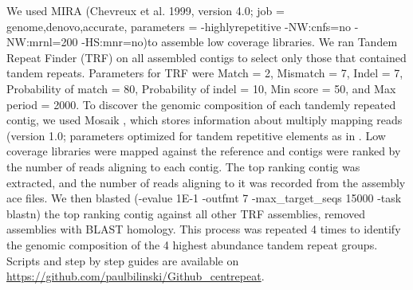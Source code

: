 \documentclass[10pt,letterpaper]{article}
\begin{document}
We used MIRA (Chevreux et al. 1999, version 4.0; job = genome,denovo,accurate, parameters = -highlyrepetitive -NW:cnfs=no -NW:mrnl=200 -HS:mnr=no)to assemble low coverage libraries.
We ran Tandem Repeat Finder \cite{benson1999tandem}  (TRF) on all assembled contigs to select only those that contained tandem repeats. 
Parameters for TRF were Match = 2, Mismatch = 7, Indel = 7, Probability of match = 80, Probability of indel = 10, Min score = 50, and Max period = 2000.
To discover the genomic composition of each tandemly repeated contig, we used Mosaik \cite{lee2014mosaik}, which stores information about multiply mapping reads (version 1.0; parameters optimized for tandem repetitive elements as in \cite{bilinski2014diversity}.
Low coverage libraries were mapped against the reference and contigs were ranked by the number of reads aligning to each contig.
The top ranking contig was extracted, and the number of reads aligning to it was recorded from the assembly ace files.
We then blasted (-evalue 1E-1 -outfmt 7 -max\_target\_seqs 15000 -task blastn) the top ranking contig against all other TRF assemblies, removed assemblies with BLAST homology.
This process was repeated 4 times to identify the genomic composition of the 4 highest abundance tandem repeat groups. 
Scripts and step by step guides are available on \url{https://github.com/paulbilinski/Github_centrepeat}.
\end{document}
